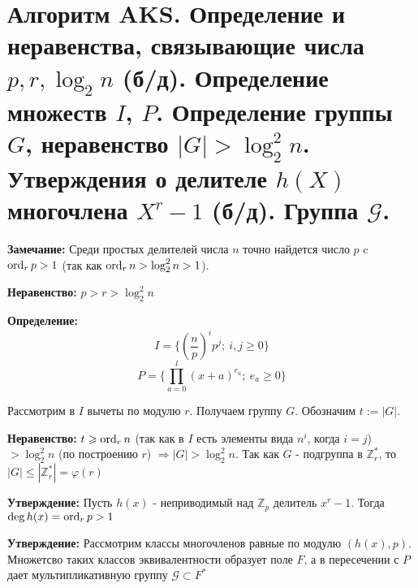 \setcounter{section}{82}
\section{Алгоритм AKS. Определение и неравенства, связывающие числа $p, r, \log_2 n$ (б/д). Определение множеств $I$, $P$. Определение группы $G$, неравенство $|G| > \log_2^2 n$. Утверждения о делителе $h(X)$ многочлена $X^r - 1$ (б/д). Группа $\mathcal{G}$.}
\par \textbf{Замечание:} Среди простых делителей числа $n$ точно найдется число $p$ c $\operatorname{ord}_r p > 1$ (так как $\operatorname{ord}_r n > \log_2^2 n > 1$).
\par \textbf{Неравенство:} $p>r>\log_2^2 n$
\par \textbf{Определение:} $$I=\{\left(\frac{n}{p}\right)^i p^j; \: i, j \geq 0 \}$$
$$P=\{\prod_{a=0}^l (x+a)^{e_a}; \: e_a \geq 0\}$$
\par Рассмотрим в $I$ вычеты по модулю $r$. Получаем группу $G$. Обозначим $t:=|G|$.
\par \textbf{Неравенство:} $t \geqslant \operatorname{ord}_r n$ (так как в $I$ есть элементы вида $n^i$, когда $i=j$) $>\log_2^2 n$ (по построению $r$) $\Rightarrow |G|>\log_2^2n$. Так как $G$ - подгруппа в $\mathbb{Z}_r^*$, то $|G|\leq |\mathbb{Z}_r^*|=\varphi(r)$
\par \textbf{Утверждение:} Пусть $h(x)$ - неприводимый над $\mathbb{Z}_p$ делитель $x^r-1$. Тогда $\deg h(x) = \operatorname{ord}_r p>1$
\par \textbf{Утверждение:} Рассмотрим классы многочленов равные по модулю $(h(x), p)$. Множетсво таких классов эквивалентности образует поле $F$, а в пересечении с $P$ дает мультипликативную группу $\mathcal{G} \subset F^*$